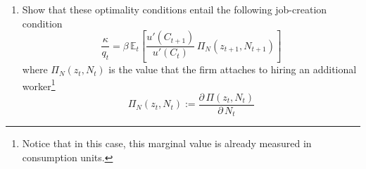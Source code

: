 \documentclass[dvipsnames,11pt]{article}
\begin{document}
\begin{enumerate}
                \begin{solution}
                 The state variables for the firm problem are productivity today $z_t$ and employment today $N_t$; control variables are vacancies today $V_t$ and employment tomorrow $N_{t+1}$. First, notice that:
\begin{align*}
    \Pi (z_0,N_0)&= \max_{(V_t,N_{t+1})_{t=0}^\infty}  z_0N_0-w_0N_0- \kappa V_0 + \mathbb{E}_0 \left [ \sum_{t=1}^\infty \beta ^j \frac{u'(C_{t+j})}{u'(C_0)} (z_tN_t-w_tN_t-\kappa V_t) \right] \\
    &= \max_{(V_t,N_{t+1})_{t=0}^\infty}  z_0N_0-w_0N_0- \kappa V_0 \\ &+ \mathbb{E}_0 \left [ \beta \frac{u'(C_1)}{u'(C_0)} \sum_{t=0}^\infty \beta ^{j} \frac{u'(C_{t+j+1})}{u'(C_1)} (z_{t+1} N_{t+1}-w_{t+1}N_{t+1}-\kappa V_{t+1}) \right] \\
    & =\max_{(V_t,N_{t+1})_{t=0}^\infty}  z_0N_0-w_0N_0- \kappa V_0 + \mathbb{E}_0 \left [Q_{0,1} \Pi(z_1,N_1) \right]
\end{align*}
Therefore, the recursive formulation is:
\begin{align*}
    \Pi(z_t,N_t)=& \max_{V_t,N_{t+1}} z_tN_t-w_tN_t-\kappa V_t+ \mathbb{E}_t [Q_{t,t+1} \Pi(z_{t+1},N_{t+1})] \\
    &\text{s.t. } N_{t+1}=(1-\lambda)N_t+q_t V_t
\end{align*}
Then, the first order conditions are:
\begin{align*}
    &V_t : -\kappa +\mu_tq_t=0, \\
    & N_{t+1}: \mathbb{E}_t \left[ Q_{t,t+1} \frac{\partial \Pi (z_{t+1},N_{t+1})}{\partial N_{t+1}} \right]-\mu_t=0.
\end{align*}
The envelope condition is:
\begin{align*}
    \frac{\partial \Pi(z_t,N_t)}{\partial N_t}=z_t-w_t+\mu_t(1-\lambda).
\end{align*}
   
                \end{solution}

            \item Show that these optimality conditions entail the following job-creation condition
            $$ \frac{\kappa}{q_t} = \beta\,\mathbb{E}_t\left[\frac{u'(C_{t+1})}{u'(C_t)}\, \Pi_N(z_{t+1},N_{t+1})\right] $$
            where $\Pi_N(z_t,N_t)$ is the value that the firm attaches to hiring an additional worker\footnote{Notice that in this case, this marginal value is already measured in consumption units.}
            $$ \Pi_N(z_t,N_t) := \frac{\partial\,\Pi(z_{t},N_{t})}{\partial\,N_t} $$


\end{enumerate}
\end{document}
